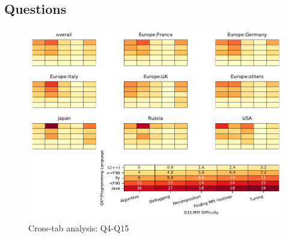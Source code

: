 
\subsection{Questions}


\begin{figure}
\begin{center}
\includegraphics[width=12cm]{../pdfs/Q4-Q15.pdf}
\caption{Cross-tab analysis: Q4-Q15}
\label{fig:Q4-Q15}
\end{center}
\end{figure}
